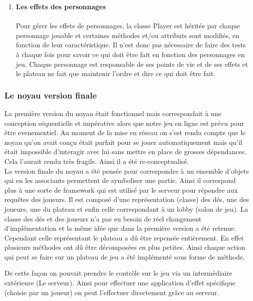 \documentclass[a4paper,11pt]{article}
\begin{document}
\begin{enumerate}
	\item \textbf{Les effets des personnages} \\\\
	Pour gérer les effets de personnages, la classe Player est héritée par chaque personnage jouable et certaines méthodes et/ou attributs sont modifiés, en fonction de leur caractéristique. Il n’est donc pas nécessaire de faire des tests à chaque fois pour savoir ce qui doit être fait en fonction des personnages en jeu. Chaque personnage est responsable de ses points de vie et de ses effets et le plateau ne fait que maintenir l’ordre et dire ce qui doit être fait.

\end{enumerate}

\subsubsection{Le noyau version finale}

	La première version du noyau était fonctionnel mais correspondait à une conception séquentielle et impérative alors que notre jeu en ligne est prévu pour être evenementiel.  Au moment de la mise en réseau on s’est rendu compte que le noyau qu’on avait conçu était parfait pour se jouer automatiquement mais qu’il était impossible d’interagir avec lui sans mettre en place de grosses dépendances. Cela l’aurait rendu très fragile. Ainsi il a été re-conceptualisé. \\
	 
	La version finale du noyau a été pensée pour correspondre à un ensemble d’objets qui en les associants permettent de symboliser une partie. Ainsi il correspond plus à une sorte de framework qui est utilisé par le serveur pour répondre aux requêtes des joueurs. Il est composé d’une représentation (classe) des dés, une des joueurs, une du plateau et enfin celle correspondant à un lobby (salon de jeu). La classe des dés et des joueurs n’a pas eu besoin de réel changement d'implémentation et la même idée que dans la première version a été retenue. Cependant celle représentant le plateau a dû être repensée entièrement. En effet plusieurs méthodes ont dû être décomposées en plus petites. Ainsi chaque action qui peut se faire sur un plateau de jeu a été implémenté sous forme de méthode.
	
\newpage

	 De cette façon on pouvait prendre le contrôle sur le jeu via un intermédiaire extérieure (Le serveur). Ainsi pour effectuer une application d'effet spécifique (choisie par un joueur) on peut l’effectuer directement grâce au serveur. \\
	
\end{document}
